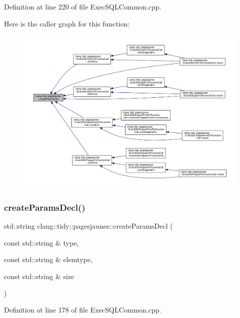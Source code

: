 Definition at line 220 of file Exec\+S\+Q\+L\+Common.\+cpp.

Here is the caller graph for this function\+:
\nopagebreak
\begin{figure}[H]
\begin{center}
\leavevmode
\includegraphics[width=350pt]{namespaceclang_1_1tidy_1_1pagesjaunes_ae8c5cda28d525b0b8a9cbbc4120275c8_icgraph}
\end{center}
\end{figure}
\mbox{\label{namespaceclang_1_1tidy_1_1pagesjaunes_ac854225e0b2f981f6b0d6f052968fa88}} 
\subsubsection{\texorpdfstring{create\+Params\+Decl()}{createParamsDecl()}}
{\footnotesize\ttfamily std\+::string clang\+::tidy\+::pagesjaunes\+::create\+Params\+Decl (\begin{DoxyParamCaption}\item[{const std\+::string \&}]{type,  }\item[{const std\+::string \&}]{elemtype,  }\item[{const std\+::string \&}]{size }\end{DoxyParamCaption})}



Definition at line 178 of file Exec\+S\+Q\+L\+Common.\+cpp.

